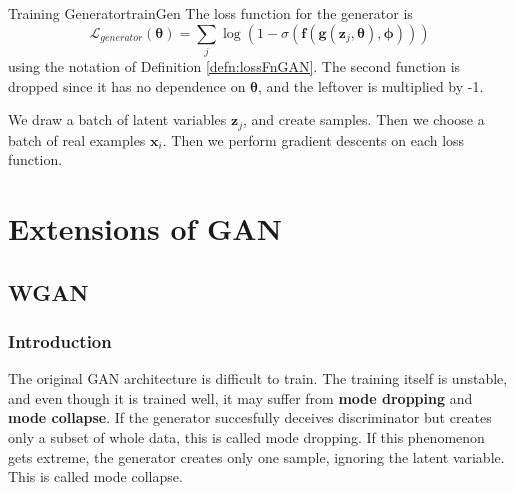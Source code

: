 \documentclass{article}
\begin{document}
            \begin{defn}{Training Generator}{trainGen}
                The loss function for the generator is
                \[
                \mathcal L_{generator} (\bm{\theta}) =
                \sum_{j} \log{(1 - \sigma(\textbf{f}(\textbf{g}(\mathbf{z}_j, \bm{\theta}), \bm{\phi})))}
                \]
                using the notation of Definition \ref{defn:lossFnGAN}. The second function is dropped since it has
                no dependence on $\bm{\theta}$, and the leftover is multiplied by -1.
            \end{defn}

            We draw a batch of latent variables $\textbf{z}_j$, and create samples. Then we choose a batch of real examples
            $\textbf{x}_i$. Then we perform gradient descents on each loss function.


\section{Extensions of GAN}\label{sec:exGAN}
    \subsection{WGAN}
        \subsubsection{Introduction}
            The original GAN architecture is difficult to train. The training itself is unstable,
            and even though it is trained well, it may suffer from \textbf{mode dropping} and \textbf{mode collapse}.
            If the generator succesfully deceives discriminator but creates only a subset of whole data, this is called mode dropping.
            If this phenomenon gets extreme, the generator creates only one sample, ignoring the latent variable.
            This is called mode collapse.
\end{document}
